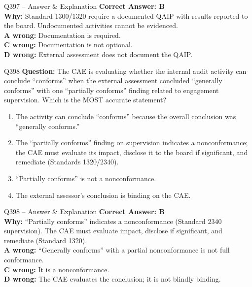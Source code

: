 \documentclass[aspectratio=169,10pt]{beamer}
\begin{document}
	\begin{frame}[t]{Q397 -- Answer \& Explanation}
		\small
		\textbf{Correct Answer: B} \\[4pt]
		\textbf{Why:} Standard 1300/1320 require a documented QAIP with results reported to the board. Undocumented activities cannot be evidenced. \\[4pt]
		\textbf{A wrong:} Documentation is required. \\[2pt]
		\textbf{C wrong:} Documentation is not optional. \\[2pt]
		\textbf{D wrong:} External assessment does not document the QAIP.
	\end{frame}
	
	\begin{frame}[t]{Q398}
		\small
		\textbf{Question:} The CAE is evaluating whether the internal audit activity can conclude ``conforms'' when the external assessment concluded ``generally conforms'' with one ``partially conforms'' finding related to engagement supervision. Which is the MOST accurate statement?
		\begin{enumerate}[label=\Alph*.,itemsep=1pt,topsep=2pt]
			\item The activity can conclude ``conforms'' because the overall conclusion was ``generally conforms.''
			\item The ``partially conforms'' finding on supervision indicates a nonconformance; the CAE must evaluate its impact, disclose it to the board if significant, and remediate (Standards 1320/2340).
			\item ``Partially conforms'' is not a nonconformance.
			\item The external assessor's conclusion is binding on the CAE.
		\end{enumerate}
	\end{frame}
	
	\begin{frame}[t]{Q398 -- Answer \& Explanation}
		\small
		\textbf{Correct Answer: B} \\[4pt]
		\textbf{Why:} ``Partially conforms'' indicates a nonconformance (Standard 2340 supervision). The CAE must evaluate impact, disclose if significant, and remediate (Standard 1320). \\[4pt]
		\textbf{A wrong:} ``Generally conforms'' with a partial nonconformance is not full conformance. \\[2pt]
		\textbf{C wrong:} It is a nonconformance. \\[2pt]
		\textbf{D wrong:} The CAE evaluates the conclusion; it is not blindly binding.
	\end{frame}
	
\end{document}
